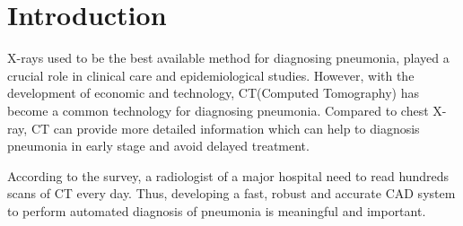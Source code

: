\documentclass[journal]{IEEEtran}
\begin{document}
%
\IEEEpeerreviewmaketitle



\section{Introduction}
% 
% 
% 
% 
 X-rays used to be the best available method for diagnosing pneumonia, played a crucial role in clinical care\cite{Franquet2001Imaging} and epidemiological studies\cite{Thomas2005Standardized}. However, with the development of economic and technology, CT(Computed Tomography) has become a common technology for diagnosing pneumonia. Compared to chest X-ray, CT can provide more detailed information which can help to diagnosis pneumonia in early stage and avoid delayed treatment.

According to the survey, a radiologist of a major hospital need to read hundreds scans of CT every day. Thus, developing a fast, robust and accurate CAD system to perform automated diagnosis of pneumonia is meaningful and important. 
\end{document}
